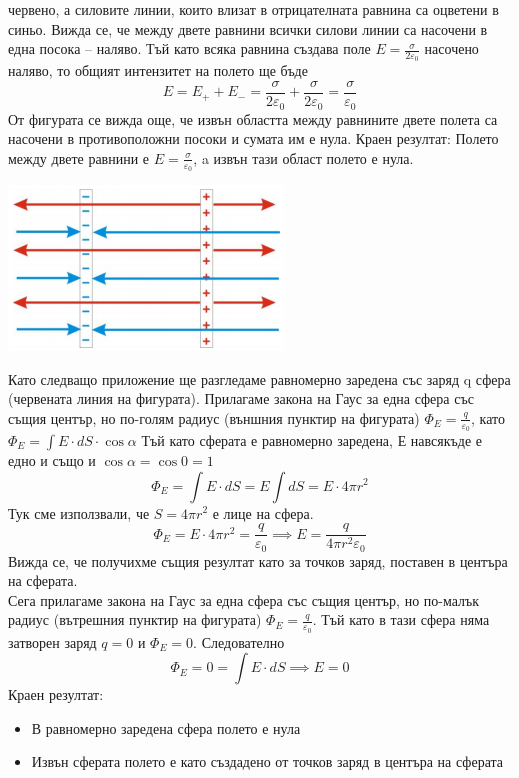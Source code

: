 \documentclass[fleqn, 12pt]{article}
\theoremstyle{definition}
\begin{document}
червено, а силовите линии, които влизат в
отрицателната равнина са оцветени в синьо.
Вижда се, че между двете равнини всички
силови линии са насочени в една посока –
наляво. Тъй като всяка равнина създава поле $E = \frac{\sigma}{2 \varepsilon_0}$ 
насочено наляво, то общият
интензитет на полето ще бъде
$$E = E_+ + E_- = \frac{\sigma}{2 \varepsilon_0} + \frac{\sigma}{2 \varepsilon_0} = \frac{\sigma}{\varepsilon_0}$$
От фигурата се вижда още,
че извън областта между равнините двете полета са насочени в противоположни
посоки и сумата им е нула. Краен резултат: Полето между двете равнини е $E = \frac{\sigma}{\varepsilon_0}$, a извън тази област полето е нула. 
\begin{center}
  \includegraphics{Pics/physics/lec6-5-2.png}
\end{center}
Като следващо приложение ще разгледаме равномерно
заредена със заряд q сфера (червената линия на
фигурата). Прилагаме закона на Гаус за една сфера със
същия център, но по-голям радиус (външния пунктир на
фигурата) $\Phi_E = \frac{q}{\varepsilon_0}$, като $\Phi_E = \int E \cdot dS \cdot \cos \alpha $
Тъй като сферата е равномерно заредена, Е навсякъде е едно и също и $\cos \alpha = \cos 0 = 1$
$$\Phi_E = \int E \cdot dS = E \int dS  = E \cdot 4 \pi r^2$$
Тук сме използвали, че $S = 4\pi r^2$ е лице на сфера. 
$$\Phi_E = E \cdot 4\pi r^2 = \frac{q}{\varepsilon_0} \implies E = \frac{q}{4 \pi r^2 \varepsilon_0}$$
Вижда се, че получихме същия резултат като за точков заряд, поставен в центъра на
сферата. \\
Сега прилагаме закона на Гаус за една сфера със същия център, но по-малък радиус
(вътрешния пунктир на фигурата) $\Phi_E = \frac{q}{\varepsilon_0}$. Тъй като в тази сфера няма затворен заряд
$q = 0$ и $\Phi_E = 0$. Следователно 
$$\Phi_E = 0 = \int E \cdot dS \implies E = 0 $$
Краен резултат: 
\begin{itemize}
\item В равномерно заредена сфера полето е нула
\item Извън сферата полето е като създадено от точков заряд в центъра на сферата 
\end{itemize}
\end{document}
